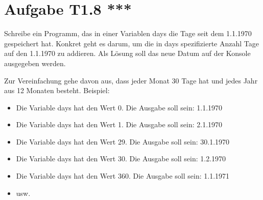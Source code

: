 \documentclass[final,a4paper]{article}
\begin{document}
\section*{Aufgabe T1.8 ***}
Schreibe ein Programm, das in einer Variablen days die Tage seit dem 1.1.1970 gespeichert hat. Konkret geht es darum, um die in days spezifizierte Anzahl Tage auf den 1.1.1970 zu addieren. Als Lösung soll das neue Datum auf der Konsole ausgegeben werden.

Zur Vereinfachung gehe davon aus, dass jeder Monat 30 Tage hat und jedes Jahr aus 12 Monaten besteht.
Beispiel:
\begin{itemize}
\item Die Variable days hat den Wert 0. Die Ausgabe soll sein: 1.1.1970
\item Die Variable days hat den Wert 1. Die Ausgabe soll sein: 2.1.1970
\item Die Variable days hat den Wert 29. Die Ausgabe soll sein: 30.1.1970
\item Die Variable days hat den Wert 30. Die Ausgabe soll sein: 1.2.1970
\item Die Variable days hat den Wert 360. Die Ausgabe soll sein: 1.1.1971
\item usw.
\end{itemize}
\end{document}
